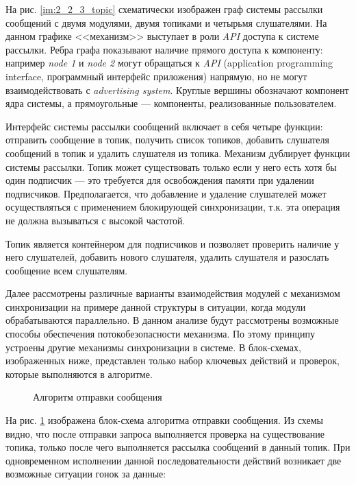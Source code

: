На рис. \ref{im:2_2_3_topic} схематически изображен граф системы 
рассылки сообщений с двумя модулями, двумя топиками и четырьмя 
слушателями. На данном графике <<механизм>> выступает в роли 
\textit{API} доступа к системе рассылки. Ребра графа показывают 
наличие прямого доступа к компоненту: например \textit{node 1} и 
\textit{node 2} могут обращаться к \textit{API} (application 
programming interface, программный интерфейс приложения) 
напрямую, но не могут взаимодействовать с \textit{advertising 
system}. Круглые вершины обозначают компонент ядра системы, а 
прямоугольные --- компоненты, реализованные пользователем.

Интерфейс системы рассылки сообщений включает в себя четыре функции: отправить сообщение в топик, получить список топиков, добавить слушателя сообщений в топик и удалить слушателя из топика. Механизм дублирует функции системы рассылки. Топик может существовать только если у него есть хотя бы один подписчик --- это требуется для освобождения памяти при удалении подписчиков. Предполагается, что добавление и удаление слушателей может осуществляться с применением блокирующей синхронизации, т.к. эта операция не должна вызываться с высокой частотой.

Топик является контейнером для подписчиков и позволяет проверить наличие у него слушателей, добавить нового слушателя, удалить слушателя и разослать сообщение всем слушателям.

Далее рассмотрены различные варианты взаимодействия модулей с 
механизмом синхронизации на примере данной структуры в ситуации, 
когда модули обрабатываются параллельно. В данном анализе будут 
рассмотрены возможные способы обеспечения потокобезопасности 
механизма. По этому принципу устроены другие механизмы 
синхронизации в системе. В блок-схемах, изображенных ниже, 
представлен только набор ключевых действий и проверок, которые 
выполняются в алгоритме. 

\begin{figure}[h]
	\caption{Алгоритм отправки сообщения}
	\label{im:2_2_5_send_message}
\end{figure}

На рис. \ref{im:2_2_5_send_message} изображена блок-схема алгоритма отправки сообщения. Из схемы видно, что после отправки запроса выполняется проверка на существование топика, только после чего выполняется рассылка сообщений в данный топик. При одновременном исполнении данной последовательности  действий возникает две возможные ситуации гонок за данные:

